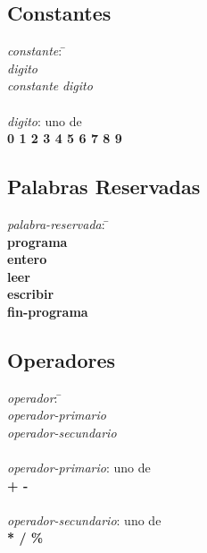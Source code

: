 \subsection{Constantes}

\begin{tabbing}

\textit{constante}: \= \+ \\
    \textit{digito} \\
    \textit{constante} \textit{digito}\\

\- \\
\textit{digito}: uno de \+ \\
    \textbf{0 1 2 3 4 5 6 7 8 9}

\end{tabbing}

\subsection{Palabras Reservadas}

\begin{tabbing}

\textit{palabra-reservada}: \= \+ \\
    \textbf{programa}\\
    \textbf{entero}\\
    \textbf{leer}\\
    \textbf{escribir}\\
    \textbf{fin-programa}

\end{tabbing}

\subsection{Operadores}

\begin{tabbing}

\textit{operador}: \= \+ \\
    \textit{operador-primario} \\
    \textit{operador-secundario} \\

\- \\ \textit{operador-primario}: uno de \+ \\
    \textbf{
        +
        \hspace{3pt}
        -
    }\\

\- \\ \textit{operador-secundario}: uno de \+ \\
    \textbf{
        *
        \hspace{3pt}
        /
        \hspace{3pt}
        \%
    }

\end{tabbing}

